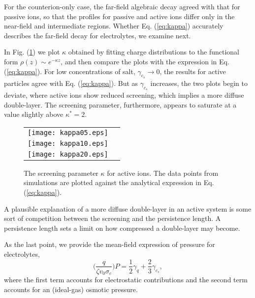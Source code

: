 \documentclass[pre,twocolumn,graphicx]{revtex4-1}
\newcommand{\be}{\begin{equation}}
\newcommand{\ee}{\end{equation}}
\begin{document}
For the counterion-only case, the far-field algebraic decay agreed with that for passive 
ions, so that the profiles for passive and active ions differ only in the near-field and intermediate regions.   
Whether Eq. (\ref{eq:kappa}) accurately describes the far-field decay for electrolytes, we examine next.  



In Fig. (\ref{fig:kappa}) we plot $\kappa$ obtained by fitting charge distributions to the 
functional form $\rho(z)\sim e^{-\kappa z}$, and then compare the plots 
with the expression in Eq. (\ref{eq:kappa}).  For low concentrations of salt, $\gamma_{c_s}\to 0$, 
the results for active particles agree with Eq. (\ref{eq:kappa}).  
But as $\gamma_{c_s}$ increases, the two plots 
begin to deviate, where active ions show reduced screening, which 
implies a more diffuse double-layer.  The screening parameter, furthermore, appears to 
saturate at a value slightly above $\kappa^* =  2$.  
\graphicspath{{figures/}}
\begin{figure}[h] 
 \begin{center}
 \begin{tabular}{rr}
  \texttt{[image: kappa05.eps]}\\
  \texttt{[image: kappa10.eps]}\\
  \texttt{[image: kappa20.eps]}
 \end{tabular}
 \end{center}
\caption{ The screening parameter $\kappa$ for active ions.  The data points from simulations are plotted 
against the analytical expression in Eq. (\ref{eq:kappa}).} 
\label{fig:kappa}
\end{figure}

A plausible explanation of a more diffuse double-layer in an active system is some sort of competition between the 
screening and the persistence length.  A persistence length sets a limit on how compressed a double-layer may become.  


As the last point, we provide the mean-field expression of pressure for electrolytes,  
\be
\bigg(\frac{q}{\zeta v_0\sigma_c}\bigg) P = \frac{1}{2}\gamma_q + \frac{2}{3}\gamma_{c_s}, 
\ee
where the first term accounts for electrostatic contributions and the second term accounts for 
an (ideal-gas) osmotic pressure.  
\end{document}

